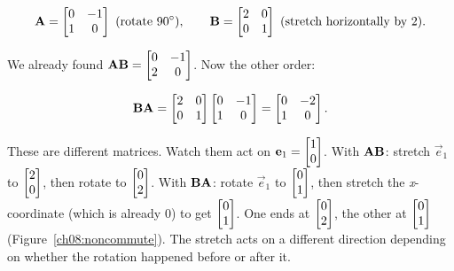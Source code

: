 \[
\mat{A} = \begin{bmatrix} 0 & -1 \\ 1 & 0 \end{bmatrix}\ (\text{rotate } 90^\circ),
\qquad
\mat{B} = \begin{bmatrix} 2 & 0 \\ 0 & 1 \end{bmatrix}\ (\text{stretch horizontally by } 2).
\]

We already found $\mathbf{A}\mathbf{B} = \begin{bmatrix} 0 & -1 \\ 2 & 0 \end{bmatrix}$.
Now the other order:

\[
\mathbf{B}\mathbf{A} = \begin{bmatrix} 2 & 0 \\ 0 & 1 \end{bmatrix}
\begin{bmatrix} 0 & -1 \\ 1 & 0 \end{bmatrix}
= \begin{bmatrix} 0 & -2 \\ 1 & 0 \end{bmatrix}.
\]

These are different matrices. Watch them act on $\mathbf{e}_1 = \begin{bmatrix}1\\0\end{bmatrix}$. With
$\mathbf{A}\mathbf{B}$: stretch $\vec{e}_1$ to $\begin{bmatrix}2\\0\end{bmatrix}$, then rotate to $\begin{bmatrix}0\\2\end{bmatrix}$.
With $\mathbf{B}\mathbf{A}$: rotate $\vec{e}_1$ to $\begin{bmatrix}0\\1\end{bmatrix}$, then stretch the
\emph{x}-coordinate (which is already $0$) to get $\begin{bmatrix}0\\1\end{bmatrix}$. One ends at
$\begin{bmatrix}0\\2\end{bmatrix}$, the other at $\begin{bmatrix}0\\1\end{bmatrix}$ (Figure~\ref{ch08:noncommute}). The
stretch acts on a different direction depending on whether the rotation happened
before or after it.

